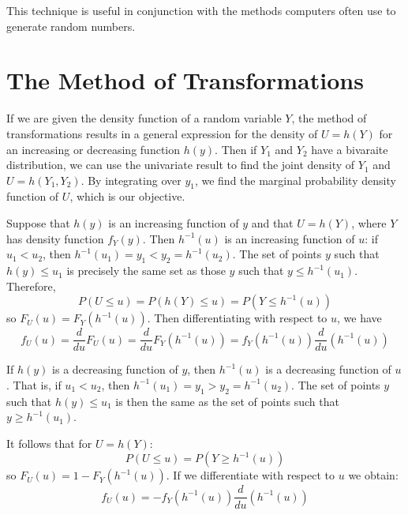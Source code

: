 \documentclass[12pt, a4paper, twoside, openright, titlepage]{book}
\begin{document}
This technique is useful in conjunction with the methods computers often use to generate random numbers.


\section{\textsection The Method of Transformations}

\begin{rmk}{}{}
    If we are given the density function of a random variable $Y$, the method of transformations results in a general expression for the density of $U = h(Y)$ for an increasing or decreasing function $h(y)$. Then if $Y_1$ and $Y_2$ have a bivaraite distribution, we can use the univariate result to find the joint density of $Y_1$ and $U = h(Y_1,Y_2)$. By integrating over $y_1$, we find the marginal probability density function of $U$, which is our objective.
\end{rmk}

Suppose that $h(y)$ is an increasing function of $y$ and that $U = h(Y)$, where $Y$ has density function $f_Y(y)$. Then $h^{-1}(u)$ is an increasing function of $u$: if $u_1 < u_2$, then $h^{-1}(u_1) = y_1 < y_2 = h^{-1}(u_2)$. The set of points $y$ such that $h(y) \leq u_1$ is precisely the same set as those $y$ such that $y \leq h^{-1}(u_1)$. Therefore, \begin{equation*}
    P(U \leq u) = P(h(Y)\leq u) = P(Y\leq h^{-1}(u))
\end{equation*}
so $F_U(u) = F_Y(h^{-1}(u))$. Then differentiating with respect to $u$, we have \begin{equation*}
    f_U(u) = \frac{d}{du}F_U(u) = \frac{d}{du}F_Y(h^{-1}(u)) = f_Y(h^{-1}(u))\frac{d}{du}(h^{-1}(u))
\end{equation*}

If $h(y)$ is a decreasing function of $y$, then $h^{-1}(u)$ is a decreasing function of $u$. That is, if $u_1 < u_2$, then $h^{-1}(u_1) = y_1 > y_2 = h^{-1}(u_2)$. The set of points $y$ such that $h(y) \leq u_1$ is then the same as the set of points such that $y \geq h^{-1}(u_1)$.

It follows that for $U = h(Y)$: \begin{equation*}
    P(U\leq u) = P(Y\geq h^{-1}(u))
\end{equation*}
so $F_U(u) = 1-F_Y(h^{-1}(u))$. If we differentiate with respect to $u$ we obtain: \begin{equation*}
    f_U(u) = -f_Y(h^{-1}(u))\frac{d}{du}(h^{-1}(u))
\end{equation*}
\end{document}
